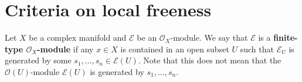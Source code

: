 \documentclass[12pt,a4paper,notitlepage]{report}
\theoremstyle{definition}
\theoremstyle{plain}
\newcommand{\mc}{\mathcal}
\newcommand{\wht}{\widehat}
\newcommand{\scr}{\mathscr}
\newcommand{\mbb}{\mathbb}
\newcommand{\blt}{\bullet}
\newcommand{\Cbb}{\mathbb C}
\numberwithin{equation}{section}
\begin{document}















\section{Criteria on local freeness}


Let $X$ be a complex manifold and $\scr E$ be an $\scr O_X$-module. We say that $\scr E$ is a \textbf{finite-type $\scr O_X$-module} if any $x\in X$ is contained in an open subset $U$ such that $\scr E_U$ is  generated by some $s_1,\dots,s_n\in\scr E(U)$. Note that this does not mean that the $\scr O(U)$-module $\scr E(U)$ is generated by $s_1,\dots,s_n$.
\end{document}
